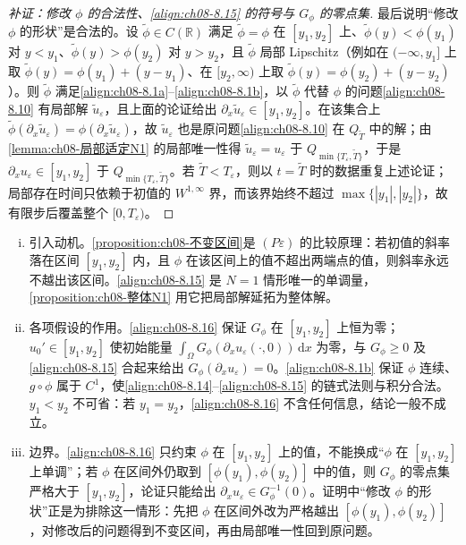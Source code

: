 \documentclass[../../main.tex]{subfiles}%
\begin{document}
\begin{proof}[补证：修改 $\phi$ 的合法性、\eqref{align:ch08-8.15} 的符号与 $G_\phi$ 的零点集]
最后说明“修改 $\phi$ 的形状”是合法的。设 $\tilde\phi\in C(\mathbb{R})$ 满足 $\tilde\phi=\phi$ 在 $[y_1,y_2]$ 上、$\tilde\phi(y)<\phi(y_1)$ 对 $y<y_1$、$\tilde\phi(y)>\phi(y_2)$ 对 $y>y_2$，且 $\tilde\phi$ 局部 Lipschitz（例如在 $(-\infty,y_1]$ 上取 $\tilde\phi(y)=\phi(y_1)+(y-y_1)$、在 $[y_2,\infty)$ 上取 $\tilde\phi(y)=\phi(y_2)+(y-y_2)$）。则 $\tilde\phi$ 满足\eqref{align:ch08-8.1a}--\eqref{align:ch08-8.1b}，以 $\tilde\phi$ 代替 $\phi$ 的问题\eqref{align:ch08-8.10} 有局部解 $\tilde u_\varepsilon$，且上面的论证给出 $\partial_x\tilde u_\varepsilon\in[y_1,y_2]$。在该集合上 $\tilde\phi(\partial_x\tilde u_\varepsilon)=\phi(\partial_x\tilde u_\varepsilon)$，故 $\tilde u_\varepsilon$ 也是原问题\eqref{align:ch08-8.10} 在 $Q_{\tilde T}$ 中的解；由\cref{lemma:ch08-局部适定N1} 的局部唯一性得 $\tilde u_\varepsilon=u_\varepsilon$ 于 $Q_{\min\{T_\varepsilon,\tilde T\}}$，于是 $\partial_xu_\varepsilon\in[y_1,y_2]$ 于 $Q_{\min\{T_\varepsilon,\tilde T\}}$。若 $\tilde T<T_\varepsilon$，则以 $t=\tilde T$ 时的数据重复上述论证；局部存在时间只依赖于初值的 $W^{1,\infty}$ 界，而该界始终不超过 $\max\{|y_1|,|y_2|\}$，故有限步后覆盖整个 $[0,T_\varepsilon)$。
\end{proof}

\begin{remark}\label{remark:ch08-不变区间动机}
\begin{enumerate}[(i)]
\item 引入动机。\cref{proposition:ch08-不变区间}是 $(P\varepsilon)$ 的比较原理：若初值的斜率落在区间 $[y_1,y_2]$ 内，且 $\phi$ 在该区间上的值不超出两端点的值，则斜率永远不越出该区间。\eqref{align:ch08-8.15} 是 $N=1$ 情形唯一的单调量，\cref{proposition:ch08-整体N1} 用它把局部解延拓为整体解。
\item 各项假设的作用。\eqref{align:ch08-8.16} 保证 $G_\phi$ 在 $[y_1,y_2]$ 上恒为零；$u_0'\in[y_1,y_2]$ 使初始能量 $\int_\Omega G_\phi(\partial_xu_\varepsilon(\cdot,0))\,\mathrm{d}x$ 为零，与 $G_\phi\geqslant0$ 及\eqref{align:ch08-8.15} 合起来给出 $G_\phi(\partial_xu_\varepsilon)=0$。\eqref{align:ch08-8.1b} 保证 $\phi$ 连续、$g\circ\phi$ 属于 $C^1$，使\eqref{align:ch08-8.14}--\eqref{align:ch08-8.15} 的链式法则与积分合法。$y_1<y_2$ 不可省：若 $y_1=y_2$，\eqref{align:ch08-8.16} 不含任何信息，结论一般不成立。
\item 边界。\eqref{align:ch08-8.16} 只约束 $\phi$ 在 $[y_1,y_2]$ 上的值，不能换成“$\phi$ 在 $[y_1,y_2]$ 上单调”；若 $\phi$ 在区间外仍取到 $[\phi(y_1),\phi(y_2)]$ 中的值，则 $G_\phi$ 的零点集严格大于 $[y_1,y_2]$，论证只能给出 $\partial_xu_\varepsilon\in G_\phi^{-1}(0)$。证明中“修改 $\phi$ 的形状”正是为排除这一情形：先把 $\phi$ 在区间外改为严格越出 $[\phi(y_1),\phi(y_2)]$，对修改后的问题得到不变区间，再由局部唯一性回到原问题。
\end{enumerate}
\end{remark}
\end{document}
